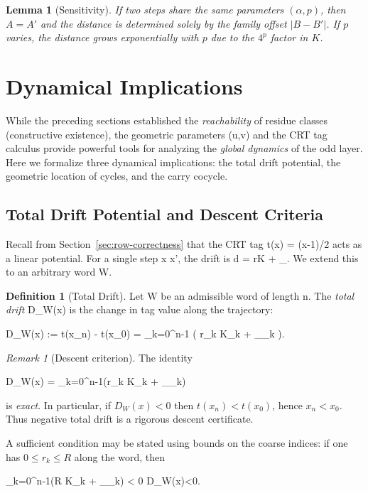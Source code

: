 \documentclass[11pt,letterpaper]{amsart}
\def\mathcal#1{#1}%
\def\({}%
\def\){}%
\def\[{ }%
\def\]{ }%
\theoremstyle{definition}
\newtheorem{definition}{Definition}
\theoremstyle{plain}
\newtheorem{lemma}{Lemma}
\theoremstyle{plain}
\theoremstyle{remark}
\newtheorem*{remark}{Remark}
\begin{document}
\begin{lemma}[Sensitivity]
If two steps share the same parameters $(\alpha, p)$, then $A=A'$ and the distance is determined solely by the family offset $|B-B'|$. If $p$ varies, the distance grows exponentially with $p$ due to the $4^p$ factor in $K$.
\end{lemma}


\section{Dynamical Implications}
\label{sec:dynamics}

While the preceding sections established the \emph{reachability} of residue classes (constructive existence), the geometric parameters \((u,v)\) and the CRT tag calculus provide powerful tools for analyzing the \emph{global dynamics} of the odd layer. Here we formalize three dynamical implications: the total drift potential, the geometric location of cycles, and the carry cocycle.

\subsection{Total Drift Potential and Descent Criteria}
Recall from Section~\ref{sec:row-correctness} that the CRT tag \(t(x) = (x-1)/2\) acts as a linear potential. For a single step \(x  x'\), the drift is \(d = rK + \Delta_\varepsilon\). We extend this to an arbitrary word \(W\).

\begin{definition}[Total Drift]
Let \(W\) be an admissible word of length \(n\). The \emph{total drift} \(\mathcal{D}_W(x)\) is the change in tag value along the trajectory:
\[
\mathcal{D}_W(x) \;:=\; t(x_n) - t(x_0) \;=\; \sum_{k=0}^{n-1} \left( r_k K_k + \Delta_{\varepsilon_k} \right).
\]
\end{definition}

\begin{remark}[Descent criterion]
\label{rem:drift-descent}
The identity
\[
\mathcal{D}_W(x) \;=\; \sum_{k=0}^{n-1}\bigl(r_k K_k + \Delta_{\varepsilon_k}\bigr)
\]
is \emph{exact}. In particular, if $\mathcal{D}_W(x)<0$ then $t(x_n)<t(x_0)$, hence $x_n<x_0$.
Thus negative total drift is a rigorous descent certificate.

A sufficient condition may be stated using bounds on the coarse indices: if one has
$0\le r_k \le R$ along the word, then
\[
\sum_{k=0}^{n-1}\bigl(R K_k + \Delta_{\varepsilon_k}\bigr) < 0
\quad\Longrightarrow\quad
\mathcal{D}_W(x)<0.
\]
\end{remark}
\end{document}
